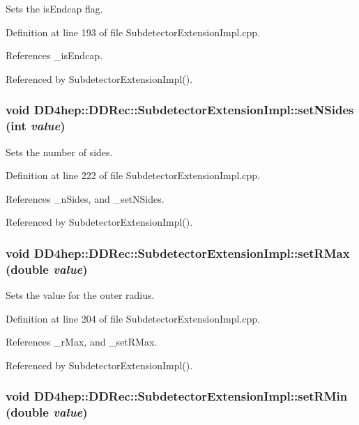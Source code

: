 Sets the isEndcap flag. 

Definition at line 193 of file SubdetectorExtensionImpl.cpp.

References \_\-isEndcap.

Referenced by SubdetectorExtensionImpl().\hypertarget{class_d_d4hep_1_1_d_d_rec_1_1_subdetector_extension_impl_a5cbc7835f1656dbb21ce4c9d3442a74b}{
\subsubsection[{setNSides}]{\setlength{\rightskip}{0pt plus 5cm}void DD4hep::DDRec::SubdetectorExtensionImpl::setNSides (int {\em value})}}
\label{class_d_d4hep_1_1_d_d_rec_1_1_subdetector_extension_impl_a5cbc7835f1656dbb21ce4c9d3442a74b}


Sets the number of sides. 

Definition at line 222 of file SubdetectorExtensionImpl.cpp.

References \_\-nSides, and \_\-setNSides.

Referenced by SubdetectorExtensionImpl().\hypertarget{class_d_d4hep_1_1_d_d_rec_1_1_subdetector_extension_impl_a3b92ffbf335b41a30b001f8bb09c985d}{
\subsubsection[{setRMax}]{\setlength{\rightskip}{0pt plus 5cm}void DD4hep::DDRec::SubdetectorExtensionImpl::setRMax (double {\em value})}}
\label{class_d_d4hep_1_1_d_d_rec_1_1_subdetector_extension_impl_a3b92ffbf335b41a30b001f8bb09c985d}


Sets the value for the outer radius. 

Definition at line 204 of file SubdetectorExtensionImpl.cpp.

References \_\-rMax, and \_\-setRMax.

Referenced by SubdetectorExtensionImpl().\hypertarget{class_d_d4hep_1_1_d_d_rec_1_1_subdetector_extension_impl_af2d58ea0ea65579e473364de314720ca}{
\subsubsection[{setRMin}]{\setlength{\rightskip}{0pt plus 5cm}void DD4hep::DDRec::SubdetectorExtensionImpl::setRMin (double {\em value})}}
\label{class_d_d4hep_1_1_d_d_rec_1_1_subdetector_extension_impl_af2d58ea0ea65579e473364de314720ca}


